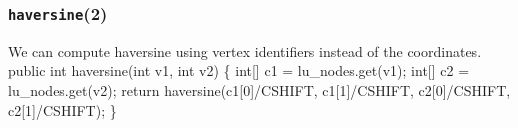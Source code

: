 \documentclass{article}
\def\nwendcode{\endtrivlist \endgroup}
\let\nwdocspar=\par
\theoremstyle{definition}
\begin{document}
\subsubsection{{\tt{}\protect{}haversine}(2)}
We can compute haversine using vertex identifiers instead of the coordinates.
\nwenddocs{}\plusendmoddef
public int haversine(int v1, int v2) \{
  int[] c1 = lu_nodes.get(v1);
  int[] c2 = lu_nodes.get(v2);
  return haversine(c1[0]/CSHIFT, c1[1]/CSHIFT,
                   c2[0]/CSHIFT, c2[1]/CSHIFT);
\}
\nwendcode{}\nwdocspar
\end{document}
